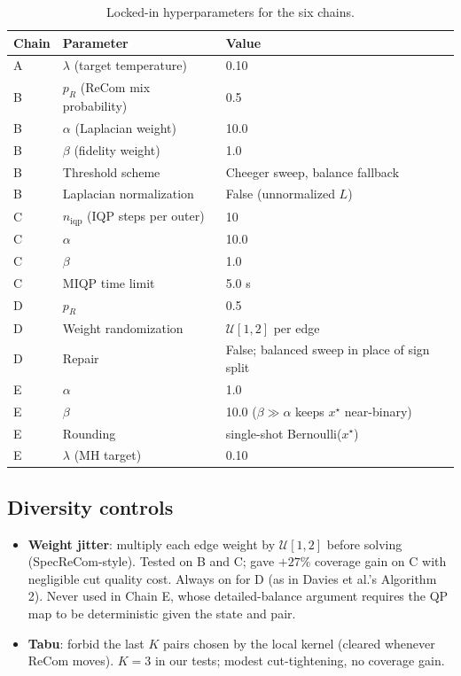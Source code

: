 \documentclass[11pt]{article}
\begin{document}
\begin{table}[H]
\centering
\small
\begin{tabular}{lll}
\toprule
Chain & Parameter & Value \\
\midrule
A & $\lambda$ (target temperature) & 0.10 \\
B & $p_R$ (ReCom mix probability) & 0.5 \\
B & $\alpha$ (Laplacian weight) & 10.0 \\
B & $\beta$ (fidelity weight) & 1.0 \\
B & Threshold scheme & Cheeger sweep, balance fallback \\
B & Laplacian normalization & False (unnormalized $L$) \\
C & $n_{\mathrm{iqp}}$ (IQP steps per outer) & 10 \\
C & $\alpha$ & 10.0 \\
C & $\beta$ & 1.0 \\
C & MIQP time limit & 5.0 s \\
D & $p_R$ & 0.5 \\
D & Weight randomization & $\mathcal{U}[1, 2]$ per edge \\
D & Repair & False; balanced sweep in place of sign split \\
E & $\alpha$ & 1.0 \\
E & $\beta$ & 10.0 ($\beta \gg \alpha$ keeps $x^\star$ near-binary) \\
E & Rounding & single-shot Bernoulli($x^\star$) \\
E & $\lambda$ (MH target) & 0.10 \\
\bottomrule
\end{tabular}
\caption{Locked-in hyperparameters for the six
  chains.}\label{tab:hyperparams}
\end{table}

\subsection{Diversity controls}\label{app:diversity}

\begin{itemize}
  \item \textbf{Weight jitter}: multiply each edge weight by
    $\mathcal{U}[1, 2]$ before solving (SpecReCom-style). Tested on B
    and C; gave $+27\%$ coverage gain on C with negligible cut quality
    cost. Always on for D (as in Davies et al.'s Algorithm 2). Never
    used in Chain E, whose detailed-balance argument requires the QP
    map to be deterministic given the state and pair.
  \item \textbf{Tabu}: forbid the last $K$ pairs chosen by the local
    kernel (cleared whenever ReCom moves). $K = 3$ in our tests;
    modest cut-tightening, no coverage gain.
\end{itemize}
\end{document}
